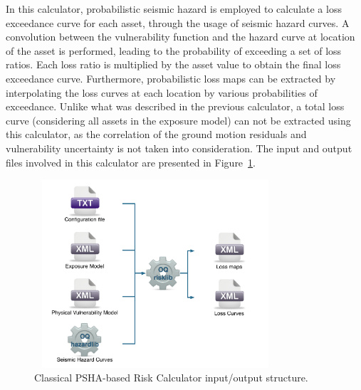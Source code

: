 In this calculator, probabilistic seismic hazard is employed to calculate a loss exceedance curve for each asset, through the usage of seismic hazard curves. A convolution between the vulnerability function and the hazard curve at location of the asset is performed, leading to the probability of exceeding a set of loss ratios. Each loss ratio is multiplied by the asset value to obtain the final loss exceedance curve. Furthermore, probabilistic loss maps can be extracted by interpolating the loss curves at each location by various probabilities of exceedance. Unlike what was described in the previous calculator, a total loss curve (considering all assets in the exposure model) can not be extracted using this calculator, as the correlation of the ground motion residuals and vulnerability uncertainty is not taken into consideration. The input and output files involved in this calculator are presented in Figure~\ref{fig:ClassicalRisk}.

\begin{figure}[ht]
\centering
\includegraphics[width=9cm,height=7cm]{figures/risk/ClassicalRisk.pdf}
\caption{Classical PSHA-based Risk Calculator input/output structure.}
\label{fig:ClassicalRisk}
\end{figure}